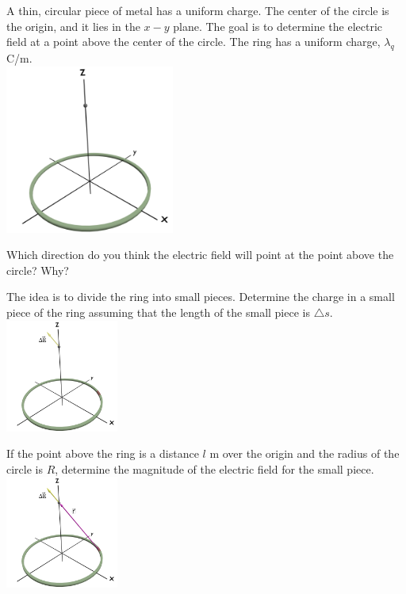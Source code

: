 \begin{problem}
  \item  A thin, circular piece of metal has a uniform charge. The center of the circle is the origin,
        and it lies in the $x-y$ plane. The goal is to determine the electric field at a point above the
        center of the circle. The ring has a uniform charge, $\lambda_q$ C/m. \\
        \includegraphics[width=15em]{blender/ringCharge}
  \begin{subproblem}
    \item Which direction do you think the electric field will point at the point above the circle? Why?
             \vspace{3em}
   \item The idea is to divide the ring into small pieces. Determine the charge in a small piece of the ring
       assuming that the length of the small piece is $\triangle s$. \\
           \includegraphics[width=10em]{blender/ringCharge-deltaE}

    \item If the point above the ring is a distance $l$ m over the origin and the radius of the circle is $R$,
      determine the magnitude of the electric field for the small piece. \\
        \includegraphics[width=10em]{blender/ringCharge-distance}


\end{subproblem}
\end{problem}
